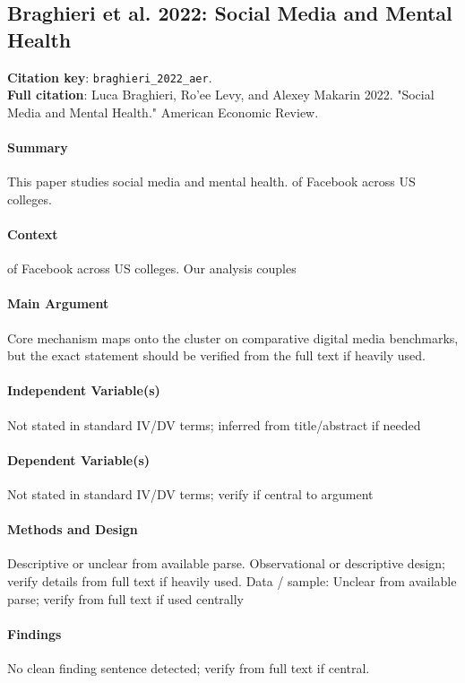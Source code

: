 \documentclass[12pt]{article}
\begin{document}
\subsection{Braghieri et al. 2022: Social Media and Mental Health}
\textbf{Citation key}: \texttt{braghieri\_2022\_aer}.\\
\textbf{Full citation}: Luca Braghieri, Ro'ee Levy, and Alexey Makarin 2022. "Social Media and Mental Health." American Economic Review.

\paragraph{Summary} This paper studies social media and mental health. of Facebook across US colleges.

\paragraph{Context} of Facebook across US colleges. Our analysis couples

\paragraph{Main Argument} Core mechanism maps onto the cluster on comparative digital media benchmarks, but the exact statement should be verified from the full text if heavily used.

\paragraph{Independent Variable(s)} Not stated in standard IV/DV terms; inferred from title/abstract if needed

\paragraph{Dependent Variable(s)} Not stated in standard IV/DV terms; verify if central to argument

\paragraph{Methods and Design} Descriptive or unclear from available parse. Observational or descriptive design; verify details from full text if heavily used. Data / sample: Unclear from available parse; verify from full text if used centrally

\paragraph{Findings} No clean finding sentence detected; verify from full text if central.
\end{document}
